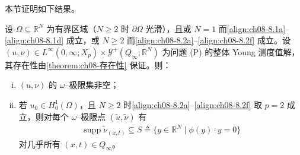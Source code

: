 \documentclass[../../main.tex]{subfiles}%
\begin{document}
本节证明如下结果。

\begin{theorem}\label{theorem:ch08-omega极限非空}
设 $\Omega\subseteq\mathbb{R}^N$ 为有界区域（$N\geqslant2$ 时 $\partial\Omega$ 光滑），且或 $N=1$ 而\eqref{align:ch08-8.1a}--\eqref{align:ch08-8.1d} 成立，或 $N\geqslant2$ 而\eqref{align:ch08-8.2a}--\eqref{align:ch08-8.2f} 成立。设 $(u,\nu)\in L^\infty(0,\infty;X_p)\times\mathcal{Y}^+(Q_\infty;\mathbb{R}^N)$ 为问题 (P) 的整体 Young 测度值解，其存在性由\cref{theorem:ch08-存在性} 保证。则：
\begin{enumerate}[(i)]
\item\label{item:ch08-omega-thm-i} $(u,\nu)$ 的 $\omega$--极限集非空；
\item\label{item:ch08-omega-thm-ii} 若 $u_0\in H^1_0(\Omega)$，且 $N\geqslant2$ 时\eqref{align:ch08-8.2a}--\eqref{align:ch08-8.2f} 取 $p=2$ 成立，则对每个 $\omega$--极限点 $(\tilde u,\tilde\nu)$ 有
\begin{align}
\operatorname{supp}\tilde\nu_{(x,t)}\subseteq S\triangleq \{y\in\mathbb{R}^N\mid\phi(y)\cdot y=0\} \label{align:ch08-8.69}
\end{align}
对几乎所有 $(x,t)\in Q_\infty$。
\end{enumerate}
\end{theorem}
\end{document}
